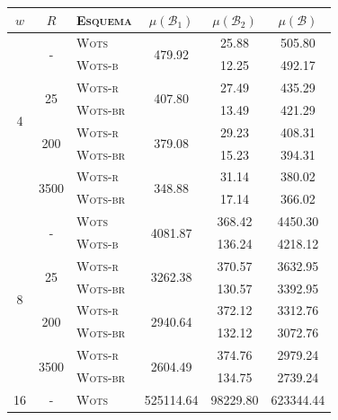 \documentclass[12pt,notitlepage]{report}
\begin{document}
\begin{table}[htbp]
    \setlength{\tabcolsep}{7pt}
    \centering
    \begin{tabular}{cclccc}
    \toprule
    $w$ & $R$ & \textsc{Esquema} & $\mu(\mathcal{B}_1)$ & $\mu(\mathcal{B}_2)$ & $\mu(\mathcal{B})$ \\
    \toprule
   \multirow{8}{*}{4} & \multirow{2}{*}{-}
       &    \textsc{Wots} &     \multirow{2}{*}{479.92} &      25.88 &     505.80 \\
     & &  \textsc{Wots-b} &      &      12.25 &     492.17 \\ \cline{2-6}
    & \multirow{2}{*}{25}
      &  \textsc{Wots-r} &     \multirow{2}{*}{407.80} &      27.49 &     435.29 \\
     & & \textsc{Wots-br} &     &      13.49 &     421.29 \\ \cline{2-6}
    & \multirow{2}{*}{200}
      &  \textsc{Wots-r} &     \multirow{2}{*}{379.08} &      29.23 &     408.31 \\
     & & \textsc{Wots-br} &      &      15.23 &     394.31 \\ \cline{2-6}
    & \multirow{2}{*}{3500}
      &  \textsc{Wots-r} &     \multirow{2}{*}{348.88} &      31.14 &     380.02 \\
     & & \textsc{Wots-br} &     &      17.14 &     366.02 \\ \hline
    \multirow{8}{*}{8} & \multirow{2}{*}{-}
       &    \textsc{Wots} &    \multirow{2}{*}{4081.87} &     368.42 &    4450.30 \\
     & &  \textsc{Wots-b} &     &     136.24 &    4218.12 \\ \cline{2-6}
    & \multirow{2}{*}{25}
      &  \textsc{Wots-r} &    \multirow{2}{*}{3262.38} &     370.57 &    3632.95 \\
     & & \textsc{Wots-br} &    &     130.57 &    3392.95 \\ \cline{2-6}
    & \multirow{2}{*}{200}
      &  \textsc{Wots-r} &    \multirow{2}{*}{2940.64} &     372.12 &    3312.76 \\
     & & \textsc{Wots-br} &     &     132.12 &    3072.76 \\ \cline{2-6}
    & \multirow{2}{*}{3500}
      &  \textsc{Wots-r} &    \multirow{2}{*}{2604.49} &     374.76 &    2979.24 \\
     & & \textsc{Wots-br} &     &     134.75 &    2739.24 \\ \hline
    \multirow{8}{*}{16} & \multirow{2}{*}{-}
       &    \textsc{Wots} &  \multirow{2}{*}{525114.64} &   98229.80 &  623344.44 \\

\end{tabular}
\end{table}
\end{document}
